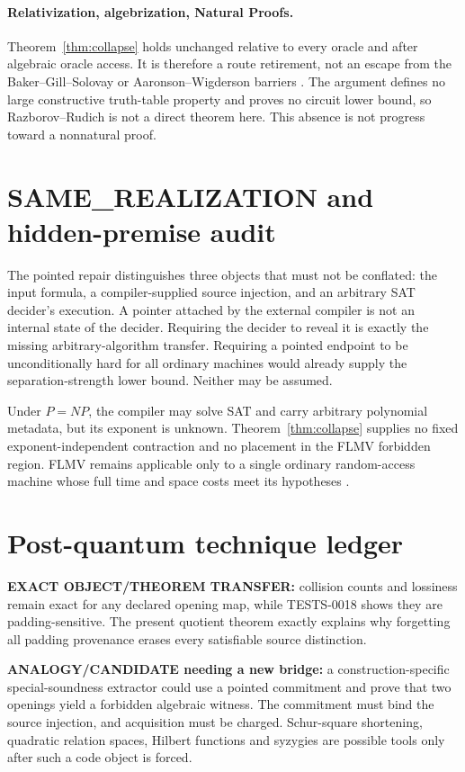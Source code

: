 \documentclass[11pt]{article}
\begin{document}
\paragraph{Relativization, algebrization, Natural Proofs.}
Theorem~\ref{thm:collapse} holds unchanged relative to every oracle and after
algebraic oracle access.  It is therefore a route retirement, not an escape
from the Baker--Gill--Solovay or Aaronson--Wigderson barriers
\cite{BGS75,AW09}.  The argument defines no large constructive truth-table
property and proves no circuit lower bound, so Razborov--Rudich is not a
direct theorem here.  This absence is not progress toward a nonnatural proof.

\section{SAME\_REALIZATION and hidden-premise audit}

The pointed repair distinguishes three objects that must not be conflated:
the input formula, a compiler-supplied source injection, and an arbitrary SAT
decider's execution.  A pointer attached by the external compiler is not an
internal state of the decider.  Requiring the decider to reveal it is exactly
the missing arbitrary-algorithm transfer.  Requiring a pointed endpoint to be
unconditionally hard for all ordinary machines would already supply the
separation-strength lower bound.  Neither may be assumed.

Under \(P=NP\), the compiler may solve SAT and carry arbitrary polynomial
metadata, but its exponent is unknown.  Theorem~\ref{thm:collapse} supplies no
fixed exponent-independent contraction and no placement in the FLMV forbidden
region.  FLMV remains applicable only to a single ordinary random-access
machine whose full time and space costs meet its hypotheses \cite{FLMV05}.

\section{Post-quantum technique ledger}

\textbf{EXACT OBJECT/THEOREM TRANSFER:} collision counts and lossiness remain
exact for any declared opening map, while TESTS-0018 shows they are
padding-sensitive.  The present quotient theorem exactly explains why
forgetting all padding provenance erases every satisfiable source distinction.

\textbf{ANALOGY/CANDIDATE needing a new bridge:} a construction-specific
special-soundness extractor could use a pointed commitment and prove that two
openings yield a forbidden algebraic witness.  The commitment must bind the
source injection, and acquisition must be charged.  Schur-square shortening,
quadratic relation spaces, Hilbert functions and syzygies are possible tools
only after such a code object is forced.
\end{document}
